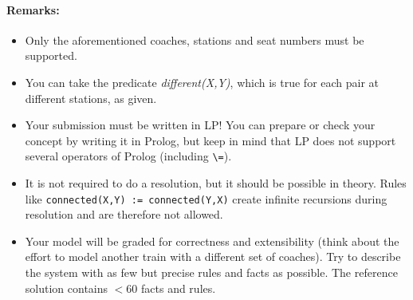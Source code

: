 \documentclass[10pt, a4paper]{article}
\begin{document}
\paragraph{Remarks:}
\begin{itemize}
    \item Only the aforementioned coaches, stations and seat numbers must be supported.
    \item You can take the predicate \textit{different(X,Y)}, which is true for each pair at different stations, as given.
    \item Your submission must be written in LP! You can prepare or check your concept by writing it in Prolog, but keep in mind that LP does not support several operators of Prolog (including \lstinline{\=}).
    \item It is not required to do a resolution, but it should be possible in theory.
    Rules like \newline\lstinline{connected(X,Y) := connected(Y,X)} create infinite recursions during resolution and are therefore not allowed.
    \item Your model will be graded for correctness and extensibility (think about the effort to model another train with a different set of coaches). Try to describe the system with as few but precise rules and facts as possible. The reference solution contains $<60$ facts and rules.
\end{itemize}
\end{document}
